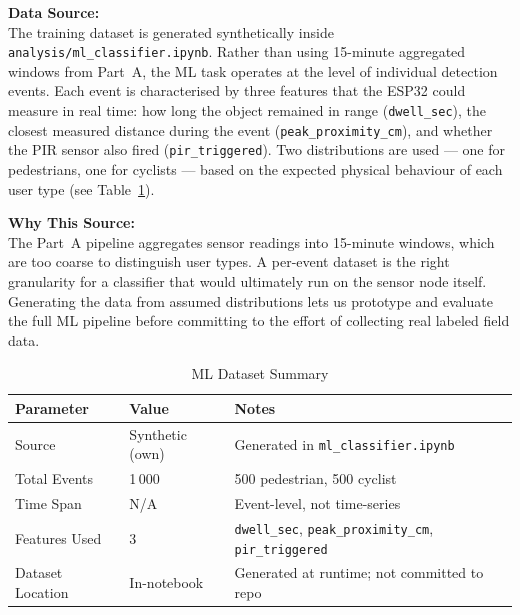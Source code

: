 \documentclass[11pt]{article}
\begin{document}
\vspace{0.5em}

\noindent\textbf{Data Source:}\\{}
The training dataset is generated synthetically inside \texttt{analysis/ml\_classifier.ipynb}. Rather than using 15-minute aggregated windows from Part~A, the ML task operates at the level of individual detection events. Each event is characterised by three features that the ESP32 could measure in real time: how long the object remained in range (\texttt{dwell\_sec}), the closest measured distance during the event (\texttt{peak\_proximity\_cm}), and whether the PIR sensor also fired (\texttt{pir\_triggered}). Two distributions are used --- one for pedestrians, one for cyclists --- based on the expected physical behaviour of each user type (see Table~\ref{tab:dataset}).

\vspace{0.5em}

\noindent\textbf{Why This Source:}\\{}
The Part~A pipeline aggregates sensor readings into 15-minute windows, which are too coarse to distinguish user types. A per-event dataset is the right granularity for a classifier that would ultimately run on the sensor node itself. Generating the data from assumed distributions lets us prototype and evaluate the full ML pipeline before committing to the effort of collecting real labeled field data.

\vspace{0.5em}

\begin{table}[htbp]
\centering
\caption{ML Dataset Summary}
\label{tab:dataset}
\begin{tabular}{@{}p{4.5cm}p{3cm}p{4.5cm}@{}}
\toprule
\textbf{Parameter} & \textbf{Value} & \textbf{Notes} \\
\midrule
Source & Synthetic (own) & Generated in \texttt{ml\_classifier.ipynb} \\
\addlinespace
Total Events & 1\,000 & 500 pedestrian, 500 cyclist \\
\addlinespace
Time Span & N/A & Event-level, not time-series \\
\addlinespace
Features Used & 3 & \texttt{dwell\_sec}, \texttt{peak\_proximity\_cm}, \texttt{pir\_triggered} \\
\addlinespace
Dataset Location & In-notebook & Generated at runtime; not committed to repo \\
\bottomrule
\end{tabular}
\end{table}
\end{document}
